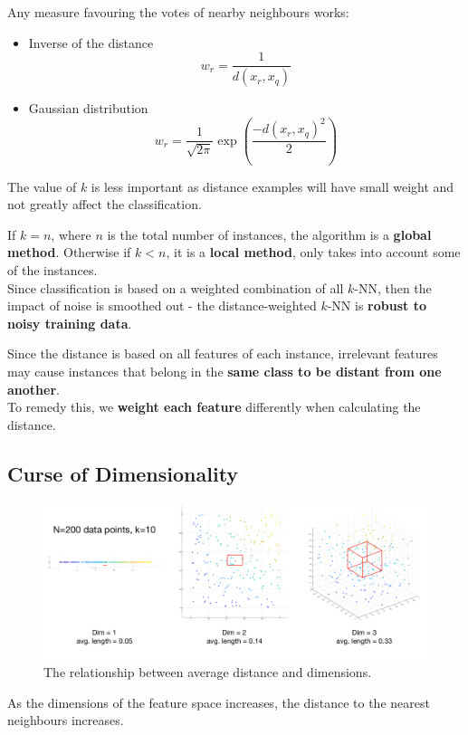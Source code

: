 \documentclass[11pt]{article}
\begin{document}
Any measure favouring the votes of nearby neighbours works:
\begin{itemize}
  \item Inverse of the distance
    \[
      w_r = \frac{1}{d(x_r, x_q)}
    \]
  \item Gaussian distribution
    \[
      w_r = \frac{1}{\sqrt{2 \pi}} \exp \left(\frac{-d(x_r, x_q)^2}{2}\right)
    \]
\end{itemize}

The value of $k$ is less important as distance examples will have small weight and not greatly affect the classification.

If $k = n$, where $n$ is the total number of instances, the algorithm is a \textbf{global method}.
Otherwise if $k < n$, it is a \textbf{local method}, only takes into account some of the instances. \\

Since classification is based on a weighted combination of all $k$-NN, then the impact of noise is smoothed out - the distance-weighted $k$-NN is \textbf{robust to noisy training data}.

Since the distance is based on all features of each instance, irrelevant features may cause instances that belong in the \textbf{same class to be distant from one another}. \\

To remedy this, we \textbf{weight each feature} differently when calculating the distance.

\subsection{Curse of Dimensionality}
\begin{figure}[h]
  \caption{The relationship between average distance and dimensions.}
  \includegraphics[scale=0.3]{curseofdim}
  \centering
\end{figure}

As the dimensions of the feature space increases, the distance to the nearest neighbours increases.
\end{document}
